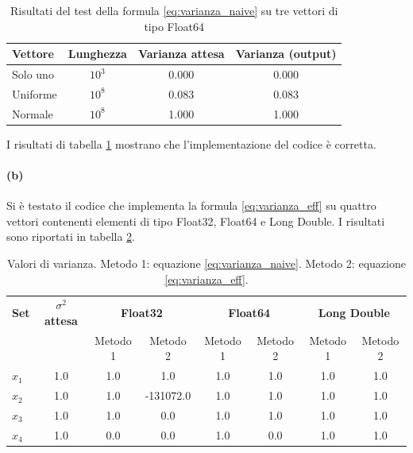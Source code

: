 \documentclass[letterpaper, 12pt]{article}
\begin{document}
\begin{table}[!ht]
\centering
\caption{Risultati del test della formula \ref{eq:varianza_naive} su tre vettori di tipo Float64}
\label{tab:varianza_test}
\begin{tabular}{|l|c|c|c|}
\hline
\textbf{Vettore} & \textbf{Lunghezza}   & \textbf{Varianza attesa} & \textbf{Varianza (output)} \\
\hline
Solo uno         & $10^3$               & 0.000                    & 0.000                       \\
Uniforme         & $10^8$               & 0.083                    & 0.083                       \\
Normale          & $10^8$               & 1.000                    & 1.000                       \\
\hline
\end{tabular}
\end{table}

I risultati di tabella \ref{tab:varianza_test} mostrano che l'implementazione del codice è corretta.

\paragraph{(b) }
Si è testato il codice che implementa la formula \ref{eq:varianza_eff} su quattro vettori contenenti
elementi di tipo Float32, Float64 e Long Double. I risultati sono riportati in tabella \ref{tab:varianza_precisioni}.

\begin{table}[!ht]
\centering
\caption{Valori di varianza. Metodo 1: equazione \ref{eq:varianza_naive}. Metodo 2: equazione \ref{eq:varianza_eff}.}
\label{tab:varianza_precisioni}
\begin{tabular}{|l|c|cc|cc|cc|}
\hline
\textbf{Set} & \textbf{$\sigma^2$ attesa} 
& \multicolumn{2}{c|}{\textbf{Float32}} 
& \multicolumn{2}{c|}{\textbf{Float64}} 
& \multicolumn{2}{c|}{\textbf{Long Double}} \\
\cline{3-8}
      &     & Metodo 1 & Metodo 2  & Metodo 1 & Metodo 2 & Metodo 1 & Metodo 2 \\
\hline
$x_1$ & 1.0 & 1.0      & 1.0       & 1.0      & 1.0      & 1.0      & 1.0 \\
$x_2$ & 1.0 & 1.0      & -131072.0 & 1.0      & 1.0      & 1.0      & 1.0 \\
$x_3$ & 1.0 & 1.0      & 0.0       & 1.0      & 1.0      & 1.0      & 1.0 \\
$x_4$ & 1.0 & 0.0      & 0.0       & 1.0      & 0.0      & 1.0      & 1.0 \\
\hline
\end{tabular}
\end{table}
\end{document}
